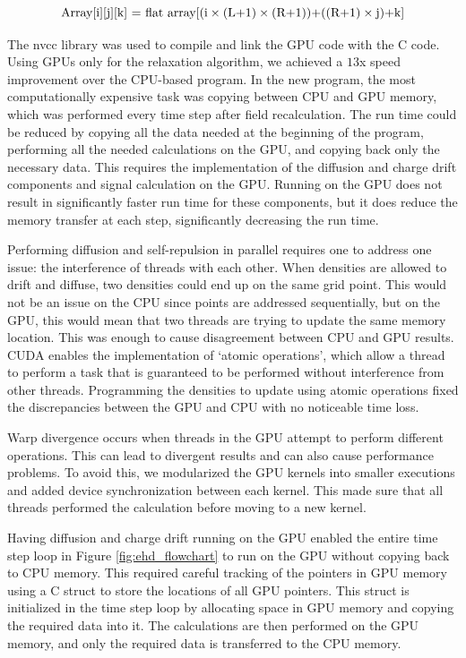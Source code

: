 \begin{equation}{\label{flat_array}}
 \text{Array[i][j][k] = flat array[(i} \times \text{(L+1)}\times \text{(R+1))+((R+1)}\times \text{j)+k]}
\end{equation}

The nvcc library was used to compile and link the GPU {\cpp} code with the {\ehd} C code. Using GPUs only for the relaxation algorithm, we achieved a $13$x speed improvement over the CPU-based program. In the new program, the most computationally expensive task was copying between CPU and GPU memory, which was performed every time step after field recalculation. The run time could be reduced by copying all the data needed at the beginning of the program, performing all the needed calculations on the GPU, and copying back only the necessary data. This requires the implementation of the diffusion and charge drift components and signal calculation on the GPU. Running on the GPU does not result in significantly faster run time for these components, but it does reduce the memory transfer at each step, significantly decreasing the run time.

Performing diffusion and self-repulsion in parallel requires one to address one issue: the interference of threads with each other. When densities are allowed to drift and diffuse, two densities could end up on the same grid point. This would not be an issue on the CPU since points are addressed sequentially, but on the GPU, this would mean that two threads are trying to update the same memory location. This was enough to cause disagreement between CPU and GPU results. CUDA enables the implementation of `atomic operations', which allow a thread to perform a task that is guaranteed to be performed without interference from other threads. Programming the densities to update using atomic operations fixed the discrepancies between the GPU and CPU with no noticeable time loss.

Warp divergence occurs when threads in the GPU attempt to perform different operations. This can lead to divergent results and can also cause performance problems. To avoid this, we modularized the GPU kernels into smaller executions and added device synchronization between each kernel. This made sure that all threads performed the calculation before moving to a new kernel.

Having diffusion and charge drift running on the GPU enabled the entire time step loop in Figure \ref{fig:ehd_flowchart} to run on the GPU without copying back to CPU memory. This required careful tracking of the pointers in GPU memory using a C struct to store the locations of all GPU pointers. This struct is initialized in the time step loop by allocating space in GPU memory and copying the required data into it. The calculations are then performed on the GPU memory, and only the required data is transferred to the CPU memory.

